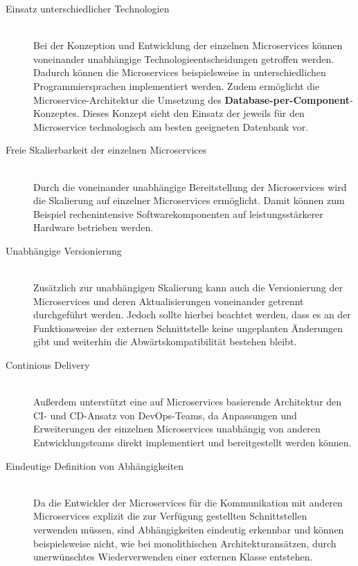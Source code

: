 \begin{description}
\item[Einsatz unterschiedlicher Technologien] \hfill \\
Bei der Konzeption und Entwicklung der einzelnen Microservices können voneinander unabhängige Technologieentscheidungen getroffen werden. Dadurch können die Microservices beispielsweise in unterschiedlichen Programmiersprachen implementiert werden. Zudem ermöglicht die Microservice-Architektur die Umsetzung des \textbf{Database-per-Component}-Konzeptes. Dieses Konzept sieht den Einsatz der jeweils für den Microservice technologisch am besten geeigneten Datenbank vor. 
\item[Freie Skalierbarkeit der einzelnen Microservices] \hfill \\
Durch die voneinander unabhängige Bereitstellung der Microservices wird die Skalierung auf einzelner Microservices ermöglicht. Damit können zum Beispiel rechenintensive Softwarekomponenten auf leistungsstärkerer Hardware betrieben werden. 

\item[Unabhängige Versionierung] \hfill \\ 
Zusätzlich zur unabhängigen Skalierung kann auch die Versionierung der Microservices und deren Aktualisierungen voneinander getrennt durchgeführt werden. Jedoch sollte hierbei beachtet werden, dass es an der Funktionsweise der externen Schnittstelle keine ungeplanten Änderungen gibt und weiterhin die Abwärtskompatibilität bestehen bleibt.

\item[Continious Delivery] \hfill \\
Außerdem unterstützt eine auf Microservices basierende Architektur den \ac{CI}- und \ac{CD}-Ansatz von DevOps-Teams, da Anpassungen und Erweiterungen der einzelnen Microservices unabhängig von anderen Entwicklungsteams direkt implementiert und bereitgestellt werden können.

\item[Eindeutige Definition von Abhängigkeiten] \hfill \\
Da die Entwickler der Microservices für die Kommunikation mit anderen Microservices explizit die zur Verfügung gestellten Schnittstellen verwenden müssen, sind Abhängigkeiten eindeutig erkennbar und können beispielsweise nicht, wie bei monolithischen Architekturansätzen, durch unerwünschtes Wiederverwenden einer externen Klasse entstehen.\autocite[Vgl.][S. 3-5, 59-63]{Wolff.2016}
\end{description}
